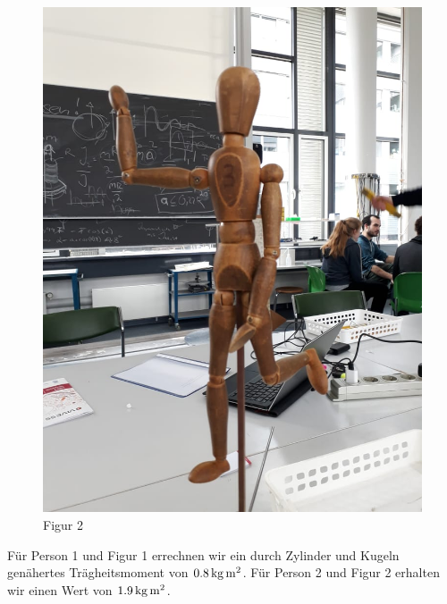 \begin{figure}
\begin{minipage}{.49\textwidth}
    \includegraphics[scale=.28]{./Bilder/figur2.jpeg}
    \caption{Figur 2}
\end{minipage}
\end{figure}


Für Person 1 und Figur 1 errechnen wir ein durch Zylinder und Kugeln genähertes Trägheitsmoment von  $\unit[0.8]{kg\,m^2}$. Für Person 2 und Figur 2 erhalten wir einen Wert von $\unit[1.9]{kg\,m^2}$. 



